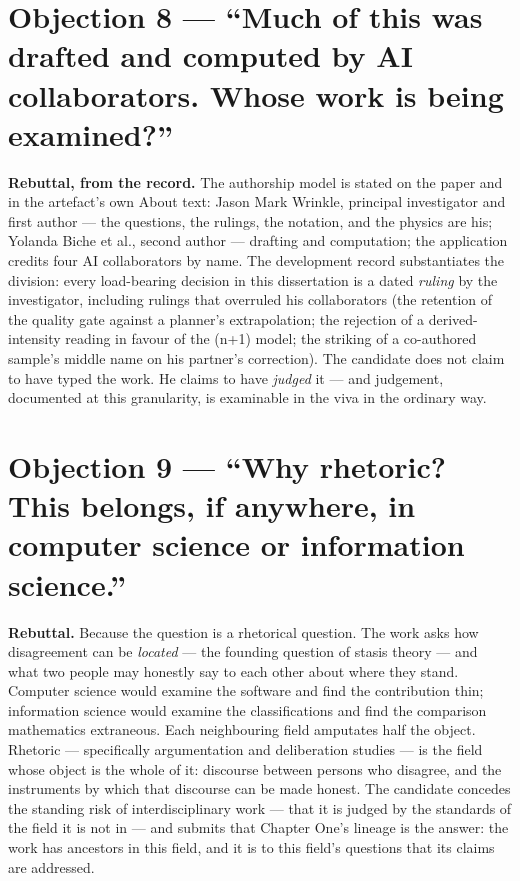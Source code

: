 \section{Objection 8 --- ``Much of this was drafted and computed by AI
collaborators. Whose work is being
examined?''}\label{objection-8-much-of-this-was-drafted-and-computed-by-ai-collaborators.-whose-work-is-being-examined}

\textbf{Rebuttal, from the record.} The authorship model is stated on
the paper and in the artefact's own About text: Jason Mark Wrinkle,
principal investigator and first author --- the questions, the rulings,
the notation, and the physics are his; Yolanda Biche et al., second
author --- drafting and computation; the application credits four AI
collaborators by name. The development record substantiates the
division: every load-bearing decision in this dissertation is a dated
\emph{ruling} by the investigator, including rulings that overruled his
collaborators (the retention of the quality gate against a planner's
extrapolation; the rejection of a derived-intensity reading in favour of
the (n+1) model; the striking of a co-authored sample's middle name on
his partner's correction). The candidate does not claim to have typed
the work. He claims to have \emph{judged} it --- and judgement,
documented at this granularity, is examinable in the viva in the
ordinary way.

\section{Objection 9 --- ``Why rhetoric? This belongs, if anywhere, in
computer science or information
science.''}\label{objection-9-why-rhetoric-this-belongs-if-anywhere-in-computer-science-or-information-science.}

\textbf{Rebuttal.} Because the question is a rhetorical question. The
work asks how disagreement can be \emph{located} --- the founding
question of stasis theory --- and what two people may honestly say to
each other about where they stand. Computer science would examine the
software and find the contribution thin; information science would
examine the classifications and find the comparison mathematics
extraneous. Each neighbouring field amputates half the object. Rhetoric
--- specifically argumentation and deliberation studies --- is the field
whose object is the whole of it: discourse between persons who disagree,
and the instruments by which that discourse can be made honest. The
candidate concedes the standing risk of interdisciplinary work --- that
it is judged by the standards of the field it is not in --- and submits
that Chapter One's lineage is the answer: the work has ancestors in this
field, and it is to this field's questions that its claims are
addressed.

